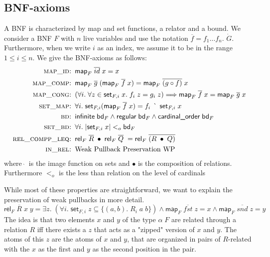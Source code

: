     \subsection{BNF-axioms}
      A \ac{BNF} is characterized by map and set functions, a relator and a bound. We consider a \ac{BNF} $F$ with $n$ live variables and use the notation $\overline{f} = f_1 \dots f_n$. $\dot{G}$. Furthermore, when we write $i$ as an index, we assume it to be in the range $1 \leq i \leq n$.
      We give the \ac{BNF}-axioms as follows:
      \begin{align}
        \textsc{map\_id: }& \textsf{map}_F\; \overline{id}\; x = x\\
        \textsc{map\_comp: }& \textsf{map}_F\; \overline{g}\; (\textsf{map}_F\; \overline{f}\; x) = \textsf{map}_F\; \overline{(g \circ f)}\; x\\
        \textsc{map\_cong: }& (\forall i.\; \forall z \in \textsf{set}_{F,i}\; x.\; f_i\; z = g_i\; z) \Longrightarrow 
          \textsf{map}_F\; \overline{f}\; x = \textsf{map}_F\; \overline{g}\; x\\
        \textsc{set\_map: }& \forall i.\; \textsf{set}_{F,i} (\textsf{map}_F\; \overline{f}\; x) = f_i\; \grave{\phantom{\_}}\; \textsf{set}_{F,i}\; x\\
        \textsc{bd: }& \textsf{infinite}\; \textsf{bd}_F \land 
          \textsf{regular}\; \textsf{bd}_F \land 
          \textsf{cardinal\_order}\; \textsf{bd}_F\\
        \textsc{set\_bd: }& \forall i.\; | \textsf{set}_{F,i}\; x | <_o \textsf{bd}_F\\
        \textsc{rel\_compp\_leq: }& \textsf{rel}_F\; \overline{R}\; \bullet\; \textsf{rel}_F\; \overline{Q}\; = 
          \textsf{rel}_F\; \overline{(R\; \bullet\; Q)}\\
        \textsc{in\_rel: }& \text{Weak Pullback Preservation WP}
      \end{align}
      \noindent where $\grave{\phantom{\_}}$ is the image function on sets and $\bullet$ is the composition of relations. Furthermore $<_o$ is the less than relation on the level of cardinals

      While most of these properties are straightforward, we want to explain the preservation of weak pullbacks in more detail.
      \begin{equation}
        \textsf{rel}_F\; \overline{R}\; x\; y = 
          \exists z.\; (\forall i.\; \textsf{set}_{F,i}\; z \subseteq \{(a, b).\; R_i\; a\; b \}) \land 
          \textsf{map}_F\; \overline{fst}\; z = x \land \textsf{map}_F\; \overline{snd}\; z = y \label{eq:WP}
      \end{equation}
      The idea is that two elements $x$ and $y$ of the type $\alpha\; F$ are related through a relation $R$ iff there exists a $z$ that acts as a "zipped" version of $x$ and $y$. The atoms of this $z$ are the atoms of $x$ and $y$, that are organized in pairs of $R$-related with the $x$ as the first and $y$ as the second position in the pair.

